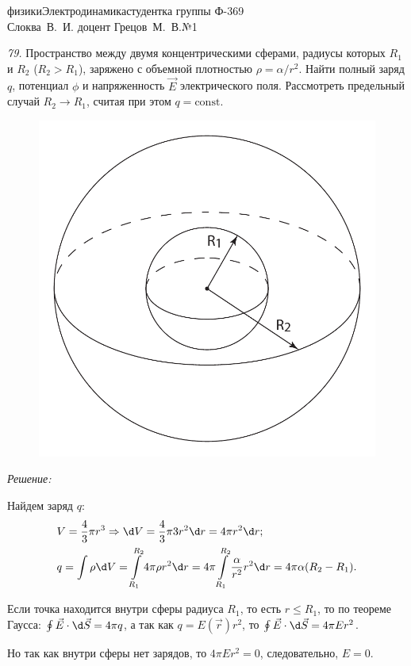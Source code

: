




{физики}{Электродинамика}{студентка группы Ф-369\\Слоква~В.~И.}
{доцент Грецов~М.~В.}{№1}

\renewcommand{\labelenumi}{\asbuk{enumi})}
\renewcommand{\v}{\mathrm{v}}

\newpage
\emph{79.} Пространство между двумя концентрическими сферами, радиусы которых
\( R_1 \) и \( R_2 \) (\( R_2 > R_1 \)), заряжено с объемной плотностью
\( \rho = \alpha/r^2 \). Найти полный заряд \( q \), потенциал \( \phi \) и
напряженность \( \vec{E} \) электрического поля. Рассмотреть предельный случай
\( R_2 \to R_1 \), считая при этом \( q = \mathrm{const} \).

\vspace*{2em}
\begin{figure}[h!]
    \center
    \includegraphics[width=.35\textwidth]{1-1}
\end{figure}
\emph{Решение:}

Найдем заряд \( q \):
\begin{align*}
    & V = \frac{4}{3}\pi r^3 \Rightarrow \d V = \frac{4}{3}\pi 3r^2\d r =
    4\pi r^2\d r; \\
    & q = \int\rho\d V = \int\limits_{R_1}^{R_2} 4\pi\rho r^2\d r = 4\pi \int
    \limits_{R_1}^{R_2} \frac{\alpha}{r^2} r^2\d r = 4\pi\alpha (R_2 - R_1).
\end{align*}

Если точка находится внутри сферы радиуса \( R_1 \), то есть \( r \le R_1 \), то
по теореме Гаусса: \( \oint \vec{E}\cdot\d\vec{S} = 4\pi q \), а так как
\( q = E(\vec{r})r^2 \), то \( \oint \vec{E}\cdot\d\vec{S} = 4\pi E r^2 \).

Но так как внутри сферы нет зарядов, то \( 4\pi E r^2 = 0 \), следовательно,
\( E = 0 \).

